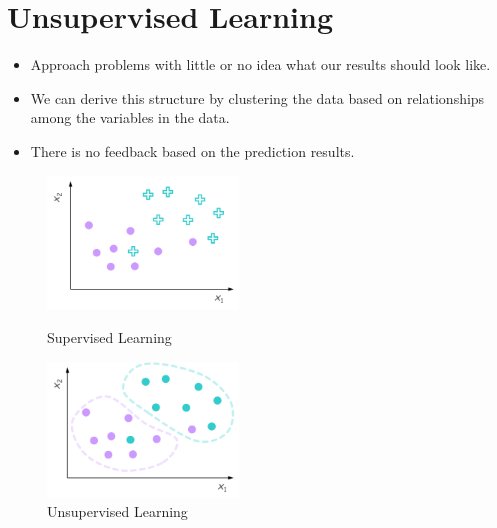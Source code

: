 \section{Unsupervised Learning}
\begin{itemize} 
    \item Approach problems with little or no idea what our results should look like. 
    \item We can derive this structure by clustering the data based on relationships among the variables in the data.
    \item There is no feedback based on the prediction results.
\end{itemize}
\begin{figure}[!htbp]
    \begin{minipage}[t]{0.5\textwidth}
        \centering
        \includegraphics[width=2.0in]{./images/supervised.png}
        \caption{Supervised Learning}
    \end{minipage}
    \begin{minipage}[t]{0.45\textwidth}
        \centering
        \includegraphics[width=2.0in]{./images/unsupervised.png}
        \caption{Unsupervised Learning}
    \end{minipage}
\end{figure}
